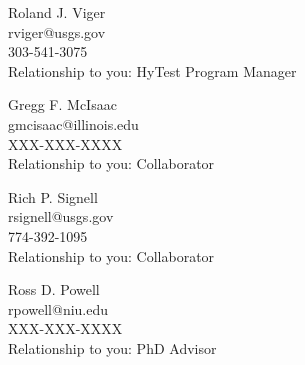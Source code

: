 \documentclass[12pt]{article}
\begin{document}
\begin{multicols}{2}
\vspace{10pt}
Roland J. Viger\\
rviger@usgs.gov \\
303-541-3075\\
Relationship to you: HyTest Program Manager

\vspace{10pt}

Gregg F. McIsaac\\
gmcisaac@illinois.edu\\
XXX-XXX-XXXX\\
Relationship to you: Collaborator
   
\vspace{10pt}

Rich P. Signell\\
rsignell@usgs.gov\\
774-392-1095\\
Relationship to you: Collaborator

\vspace{10pt}

Ross D. Powell\\
rpowell@niu.edu\\
XXX-XXX-XXXX\\
Relationship to you: PhD Advisor



\end{multicols}
\end{document}
